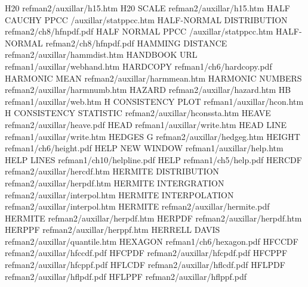 H20                                     refman2/auxillar/h15.htm
H20 SCALE                               refman2/auxillar/h15.htm
HALF CAUCHY PPCC                        /auxillar/statppcc.htm
HALF-NORMAL DISTRIBUTION                refman2/ch8/hfnpdf.pdf
HALF NORMAL PPCC                        /auxillar/statppcc.htm
HALF-NORMAL                             refman2/ch8/hfnpdf.pdf
HAMMING DISTANCE                        refman2/auxillar/hammdist.htm
HANDBOOK URL                            refman1/auxillar/webhand.htm
HARDCOPY                                refman1/ch6/hardcopy.pdf
HARMONIC MEAN                           refman2/auxillar/harmmean.htm
HARMONIC NUMBERS                        refman2/auxillar/harmnumb.htm
HAZARD                                  refman2/auxillar/hazard.htm
HB                                      refman1/auxillar/web.htm
H CONSISTENCY PLOT                      refman1/auxillar/hcon.htm
H CONSISTENCY STATISTIC                 refman2/auxillar/hconssta.htm
HEAVE                                   refman2/auxillar/heave.pdf
HEAD                                    refman1/auxillar/write.htm
HEAD LINE                               refman1/auxillar/write.htm
HEDGES G                                refman2/auxillar/hedgeg.htm
HEIGHT                                  refman1/ch6/height.pdf
HELP NEW WINDOW                         refman1/auxillar/help.htm
HELP LINES                              refman1/ch10/helpline.pdf
HELP                                    refman1/ch5/help.pdf
HERCDF                                  refman2/auxillar/hercdf.htm
HERMITE DISTRIBUTION                    refman2/auxillar/herpdf.htm
HERMITE INTERGRATION                    refman2/auxillar/interpol.htm
HERMITE INTERPOLATION                   refman2/auxillar/interpol.htm
HERMITE                                 refman2/auxillar/hermite.pdf
HERMITE                                 refman2/auxillar/herpdf.htm
HERPDF                                  refman2/auxillar/herpdf.htm
HERPPF                                  refman2/auxillar/herppf.htm
HERRELL DAVIS                           refman2/auxillar/quantile.htm
HEXAGON                                 refman1/ch6/hexagon.pdf
HFCCDF                                  refman2/auxillar/hfccdf.pdf
HFCPDF                                  refman2/auxillar/hfcpdf.pdf
HFCPPF                                  refman2/auxillar/hfcppf.pdf
HFLCDF                                  refman2/auxillar/hflcdf.pdf
HFLPDF                                  refman2/auxillar/hflpdf.pdf
HFLPPF                                  refman2/auxillar/hflppf.pdf
